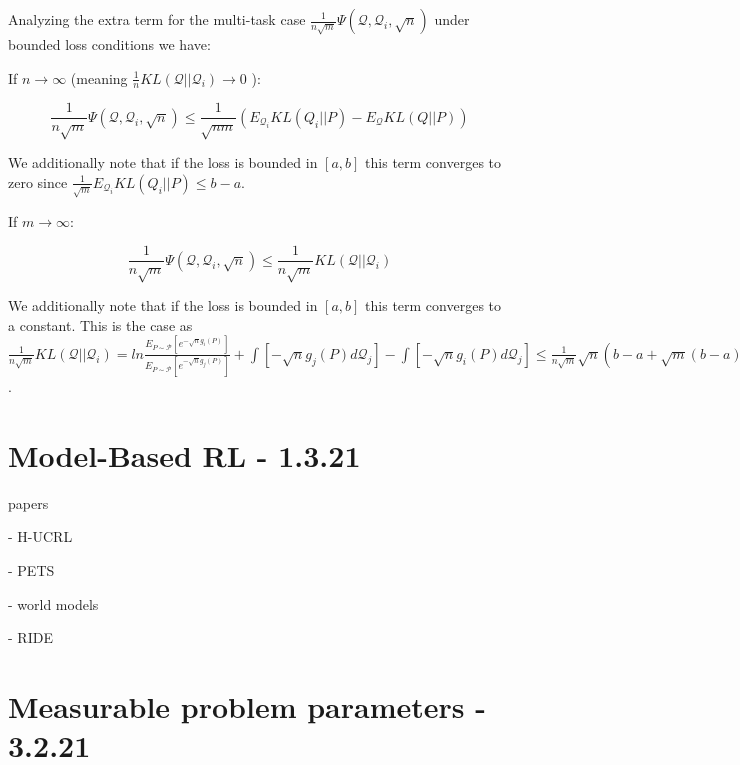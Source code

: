\documentclass[letterpaper]{article}
\theoremstyle{definition}
\begin{document}
Analyzing the extra term for the multi-task case
$\frac{1}{n\sqrt{m}}\Psi(\mathcal{Q}, \mathcal{Q}_i, \sqrt{n})$
under bounded loss conditions we have:

If $n\rightarrow\infty$ (meaning $\frac{1}{n}KL(\mathcal{Q}||\mathcal{Q}_i)\rightarrow 0$ ):

$$\frac{1}{n\sqrt{m}}\Psi(\mathcal{Q}, \mathcal{Q}_i, \sqrt{n})\leq  \frac{1}{\sqrt{nm}}\left ( E_{\mathcal{Q}_i} KL(Q_i||P) - E_{\mathcal{Q}} KL(Q||P) \right )$$

We additionally note that if the loss is bounded in $[a,b]$ this term converges to zero since $\frac{1}{\sqrt{m}}E_{\mathcal{Q}_i} KL(Q_i||P)\leq b-a$.

If $m\rightarrow\infty$:

$$\frac{1}{n\sqrt{m}}\Psi(\mathcal{Q}, \mathcal{Q}_i, \sqrt{n})\leq \frac{1}{n\sqrt{m}}KL(\mathcal{Q}||\mathcal{Q}_i)$$

We additionally note that if the loss is bounded in $[a,b]$ this term converges to a constant. This is the case as $\frac{1}{n\sqrt{m}}KL(\mathcal{Q}||\mathcal{Q}_i)= ln\frac{E_{P\sim \mathcal{P}} \left [ e^{-\sqrt{n} g_i(P) } \right ]}{E_{P\sim \mathcal{P}} \left [ e^{-\sqrt{n} g_j(P) }\right ]} +\int \left [ -\sqrt{n} g_j(P) d\mathcal{Q}_j \right ] - \int \left [-\sqrt{n} g_i(P) d\mathcal{Q}_j \right ]\leq \frac{1}{n\sqrt{m}}\sqrt{n}(b-a+\sqrt{m}(b-a) + b-a+\sqrt{m}(b-a))=\frac{2(b-a)}{\sqrt{nm}}+\frac{2(b-a)}{\sqrt{n}}$.

\section{Model-Based RL - 1.3.21} \label{sec:mbrl}

papers

\cite{Curi2020} - H-UCRL

\cite{Chua2018} - PETS

\cite{Ha2018} - world models

\cite{Raileanu2020} - RIDE

\section{Measurable problem parameters - 3.2.21} \label{sec:experiments}
\end{document}
